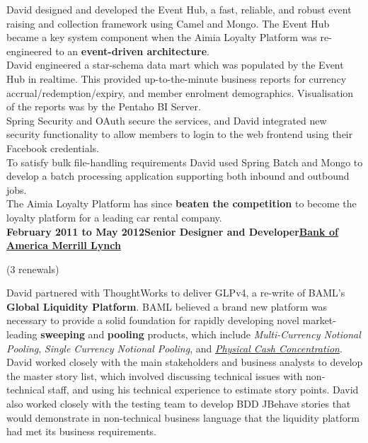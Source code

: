 \documentclass[a4paper,12pt]{article}
\newcommand{\clientwork}[3]{\textbf{#1\hfill#3\hfill#2}\nopagebreak}
\newcommand{\renewals}[2]{(#2)\nopagebreak}
\begin{document}
David designed and developed the Event Hub, a fast, reliable, and robust event raising and collection framework using Camel and Mongo. The Event Hub became a key system component when the Aimia Loyalty Platform was re-engineered to an \textbf{event-driven architecture}.\\

David engineered a star-schema data mart which was populated by the Event Hub in realtime. This provided up-to-the-minute business reports for currency accrual/redemption/expiry, and member enrolment demographics. Visualisation of the reports was by the Pentaho BI Server.\\

Spring Security and OAuth secure the services, and David integrated new security functionality to allow members to login to the web frontend using their Facebook credentials.\\

To satisfy bulk file-handling requirements David used Spring Batch and Mongo to develop a batch processing application supporting both inbound and outbound jobs.\\

The Aimia Loyalty Platform has since \textbf{beaten the competition} to become the loyalty platform for a leading car rental company.\\

\clientwork{February 2011 to May 2012}{\href{http://corp.bankofamerica.com/}{Bank of America Merrill Lynch}}{Senior Designer and Developer}

\renewals{15 months}{3 renewals}


David partnered with ThoughtWorks to deliver GLPv4, a re-write of BAML's \textbf{Global Liquidity Platform}. BAML believed a brand new platform was necessary to provide a solid foundation for rapidly developing novel market-leading \textbf{sweeping} and \textbf{pooling} products, which include \emph{Multi-Currency Notional Pooling}, \emph{Single Currency Notional Pooling}, and \emph{\href{http://www.marketwatch.com/story/bank-of-america-merrill-lynch-adds-physical-cash-concentration-to-global-liquidity-platform-2012-03-19}{Physical Cash Concentration}}.\\

David worked closely with the main stakeholders and business analysts to develop the master story list, which involved discussing technical issues with non-technical staff, and using his technical experience to estimate story points. David also worked closely with the testing team to develop BDD JBehave stories that would demonstrate in non-technical business language that the liquidity platform had met its business requirements.\\
\end{document}
